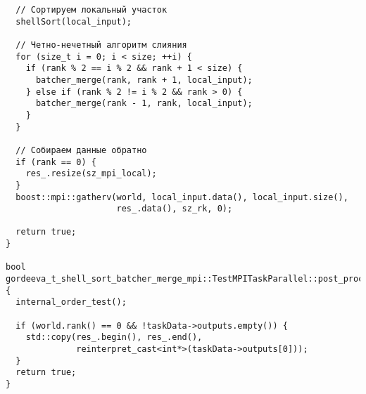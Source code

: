 \documentclass[a4paper,12pt]{article}
\begin{document}
\begin{verbatim}
  // Сортируем локальный участок
  shellSort(local_input);

  // Четно-нечетный алгоритм слияния
  for (size_t i = 0; i < size; ++i) {
    if (rank % 2 == i % 2 && rank + 1 < size) {
      batcher_merge(rank, rank + 1, local_input);
    } else if (rank % 2 != i % 2 && rank > 0) {
      batcher_merge(rank - 1, rank, local_input);
    }
  }

  // Собираем данные обратно
  if (rank == 0) {
    res_.resize(sz_mpi_local);
  }
  boost::mpi::gatherv(world, local_input.data(), local_input.size(),
                      res_.data(), sz_rk, 0);

  return true;
}

bool gordeeva_t_shell_sort_batcher_merge_mpi::TestMPITaskParallel::post_processing() {
  internal_order_test();

  if (world.rank() == 0 && !taskData->outputs.empty()) {
    std::copy(res_.begin(), res_.end(),
              reinterpret_cast<int*>(taskData->outputs[0]));
  }
  return true;
}
\end{verbatim}
\end{document}
